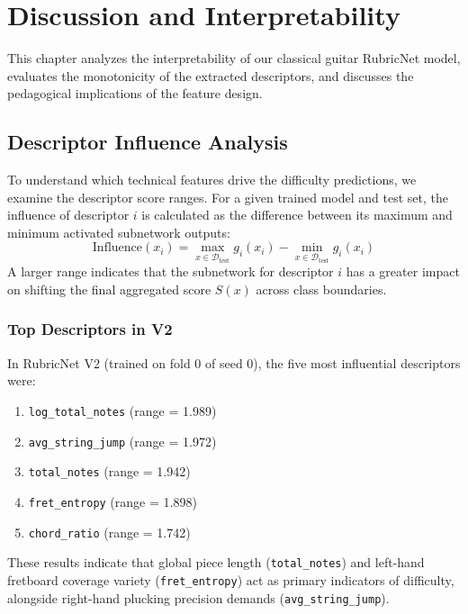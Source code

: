 \chapter{Discussion and Interpretability}
\label{ch:discussion}

This chapter analyzes the interpretability of our classical guitar RubricNet model, evaluates the monotonicity of the extracted descriptors, and discusses the pedagogical implications of the feature design.

\section{Descriptor Influence Analysis}
To understand which technical features drive the difficulty predictions, we examine the descriptor score ranges. For a given trained model and test set, the influence of descriptor $i$ is calculated as the difference between its maximum and minimum activated subnetwork outputs:
\begin{equation}
    \text{Influence}(x_i) = \max_{x \in \mathcal{D}_{\text{test}}} g_i(x_i) - \min_{x \in \mathcal{D}_{\text{test}}} g_i(x_i)
\end{equation}
A larger range indicates that the subnetwork for descriptor $i$ has a greater impact on shifting the final aggregated score $S(x)$ across class boundaries.

\subsection{Top Descriptors in V2}
In RubricNet V2 (trained on fold 0 of seed 0), the five most influential descriptors were:
\begin{enumerate}
    \item \texttt{log\_total\_notes} (range = 1.989)
    \item \texttt{avg\_string\_jump} (range = 1.972)
    \item \texttt{total\_notes} (range = 1.942)
    \item \texttt{fret\_entropy} (range = 1.898)
    \item \texttt{chord\_ratio} (range = 1.742)
\end{enumerate}
These results indicate that global piece length (\texttt{total\_notes}) and left-hand fretboard coverage variety (\texttt{fret\_entropy}) act as primary indicators of difficulty, alongside right-hand plucking precision demands (\texttt{avg\_string\_jump}).


